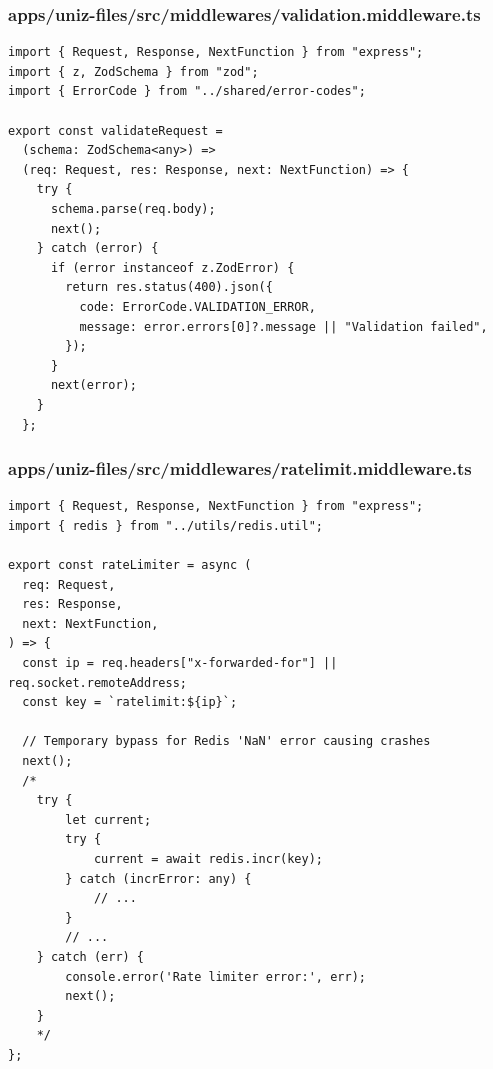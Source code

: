 \documentclass[11pt,a4paper,oneside]{article}
\begin{document}
\subsubsection*{apps/uniz-files/src/middlewares/validation.middleware.ts}
\begin{lstlisting}
import { Request, Response, NextFunction } from "express";
import { z, ZodSchema } from "zod";
import { ErrorCode } from "../shared/error-codes";

export const validateRequest =
  (schema: ZodSchema<any>) =>
  (req: Request, res: Response, next: NextFunction) => {
    try {
      schema.parse(req.body);
      next();
    } catch (error) {
      if (error instanceof z.ZodError) {
        return res.status(400).json({
          code: ErrorCode.VALIDATION_ERROR,
          message: error.errors[0]?.message || "Validation failed",
        });
      }
      next(error);
    }
  };

\end{lstlisting}
\subsubsection*{apps/uniz-files/src/middlewares/ratelimit.middleware.ts}
\begin{lstlisting}
import { Request, Response, NextFunction } from "express";
import { redis } from "../utils/redis.util";

export const rateLimiter = async (
  req: Request,
  res: Response,
  next: NextFunction,
) => {
  const ip = req.headers["x-forwarded-for"] || req.socket.remoteAddress;
  const key = `ratelimit:${ip}`;

  // Temporary bypass for Redis 'NaN' error causing crashes
  next();
  /*
    try {
        let current;
        try {
            current = await redis.incr(key);
        } catch (incrError: any) {
            // ...
        }
        // ...
    } catch (err) {
        console.error('Rate limiter error:', err);
        next();
    }
    */
};

\end{lstlisting}
\end{document}
